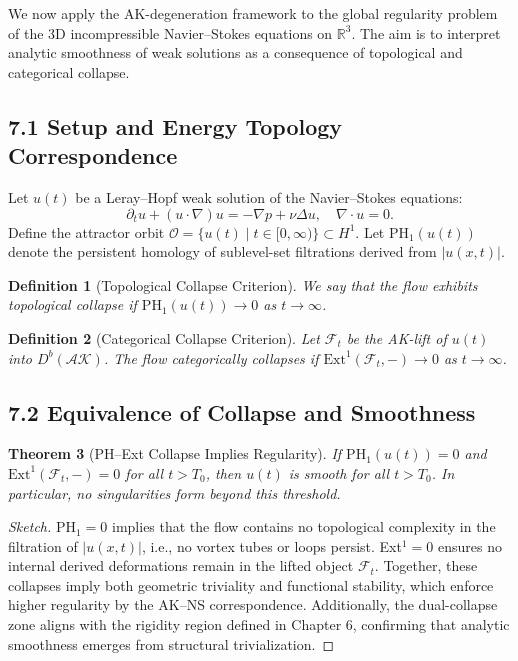 \documentclass[11pt]{article}
\newtheorem{theorem}{Theorem}[section]
\newtheorem{definition}[theorem]{Definition}
\begin{document}
We now apply the AK-degeneration framework to the global regularity problem of the 3D incompressible Navier--Stokes equations on $\mathbb{R}^3$. The aim is to interpret analytic smoothness of weak solutions as a consequence of topological and categorical collapse.

\subsection{7.1 Setup and Energy Topology Correspondence}

Let $u(t)$ be a Leray–Hopf weak solution of the Navier--Stokes equations:
\[
\partial_t u + (u \cdot \nabla) u = -\nabla p + \nu \Delta u, \quad \nabla \cdot u = 0.
\]
Define the attractor orbit $\mathcal{O} = \{ u(t) \mid t \in [0, \infty) \} \subset H^1$. Let $\mathrm{PH}_1(u(t))$ denote the persistent homology of sublevel-set filtrations derived from $|u(x,t)|$.

\begin{definition}[Topological Collapse Criterion]
We say that the flow exhibits topological collapse if $\mathrm{PH}_1(u(t)) \to 0$ as $t \to \infty$.
\end{definition}

\begin{definition}[Categorical Collapse Criterion]
Let $\mathcal{F}_t$ be the AK-lift of $u(t)$ into $D^b(\mathcal{AK})$. The flow categorically collapses if $\mathrm{Ext}^1(\mathcal{F}_t, -) \to 0$ as $t \to \infty$.
\end{definition}

\subsection{7.2 Equivalence of Collapse and Smoothness}

\begin{theorem}[PH--Ext Collapse Implies Regularity]
If $\mathrm{PH}_1(u(t)) = 0$ and $\mathrm{Ext}^1(\mathcal{F}_t, -) = 0$ for all $t > T_0$, then $u(t)$ is smooth for all $t > T_0$. In particular, no singularities form beyond this threshold.
\end{theorem}

\begin{proof}[Sketch]
PH$_1 = 0$ implies that the flow contains no topological complexity in the filtration of $|u(x,t)|$, i.e., no vortex tubes or loops persist. Ext$^1 = 0$ ensures no internal derived deformations remain in the lifted object $\mathcal{F}_t$. Together, these collapses imply both geometric triviality and functional stability, which enforce higher regularity by the AK–NS correspondence. Additionally, the dual-collapse zone aligns with the rigidity region defined in Chapter 6, confirming that analytic smoothness emerges from structural trivialization.
\end{proof}
\end{document}
